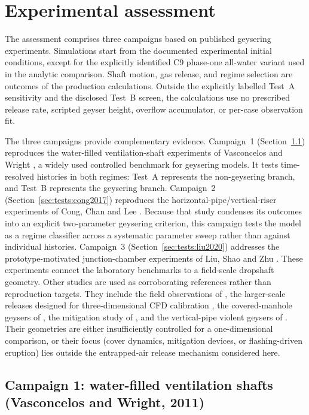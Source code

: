 \section{Experimental assessment}
\label{sec:tests}

The assessment comprises three campaigns based on published geysering
experiments. Simulations start from the
documented experimental initial conditions, except for the explicitly
identified C9 phase-one all-water variant used in the analytic comparison.
Shaft motion, gas release, and regime selection are outcomes of the production
calculations. Outside the explicitly labelled Test~A sensitivity and the
disclosed Test~B screen, the calculations use no prescribed release rate,
scripted geyser height, overflow accumulator, or per-case observation fit.

The three campaigns provide complementary evidence.
Campaign~1 (Section~\ref{sec:tests:vw2011}) reproduces the water-filled
ventilation-shaft experiments of Vasconcelos and Wright
\cite{vasconcelos2011}, a widely used controlled benchmark for geysering
models. It tests time-resolved histories in both regimes: Test~A represents the
non-geysering branch, and Test~B represents the geysering branch.
Campaign~2 (Section~\ref{sec:tests:cong2017}) reproduces the
horizontal-pipe/vertical-riser experiments of Cong, Chan and Lee
\cite{cong2017}. Because that study condenses its outcomes into an explicit
two-parameter geysering criterion, this campaign tests the model as a regime
classifier across a systematic parameter sweep rather than against individual
histories.
Campaign~3 (Section~\ref{sec:tests:liu2020}) addresses the
prototype-motivated junction-chamber experiments of Liu, Shao and Zhu
\cite{liu2020}. These experiments connect the laboratory benchmarks to a
field-scale dropshaft geometry.
Other studies are used as corroborating references rather than reproduction
targets. They include the field observations of \cite{wright2011note}, the
larger-scale releases designed for three-dimensional CFD calibration
\cite{muller2017}, the covered-manhole geysers of \cite{zhang2022}, the
mitigation study of \cite{qian2020}, and the vertical-pipe violent geysers of
\cite{leon2018}. Their geometries are either insufficiently controlled for a
one-dimensional comparison, or their focus (cover dynamics, mitigation
devices, or flashing-driven eruption) lies outside the entrapped-air release
mechanism considered here.

\subsection{Campaign 1: water-filled ventilation shafts
(Vasconcelos and Wright, 2011)}
\label{sec:tests:vw2011}

